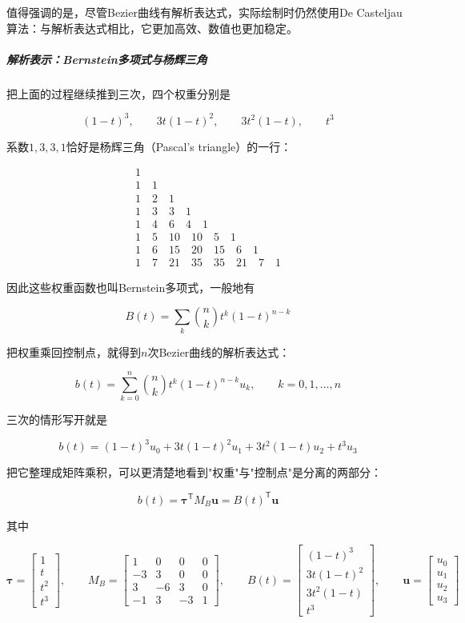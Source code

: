 值得强调的是，尽管Bezier曲线有解析表达式，实际绘制时仍然使用De Casteljau算法：与解析表达式相比，它更加高效、数值也更加稳定。

\subparagraph{解析表示：Bernstein多项式与杨辉三角}

把上面的过程继续推到三次，四个权重分别是

\[
(1-t)^3,\qquad 3t(1-t)^2,\qquad 3t^2(1-t),\qquad t^3
\]

系数$1,3,3,1$恰好是杨辉三角（Pascal's triangle）的一行：

\[
\begin{array}{c}
1\\[1pt] 1\quad 1\\[1pt] 1\quad 2\quad 1\\[1pt] 1\quad 3\quad 3\quad 1\\[1pt]
1\quad 4\quad 6\quad 4\quad 1\\[1pt] 1\quad 5\quad 10\quad 10\quad 5\quad 1\\[1pt]
1\quad 6\quad 15\quad 20\quad 15\quad 6\quad 1\\[1pt]
1\quad 7\quad 21\quad 35\quad 35\quad 21\quad 7\quad 1
\end{array}
\]

因此这些权重函数也叫Bernstein多项式，一般地有

\[
B(t) = \sum_{k}\binom{n}{k}t^k(1-t)^{n-k}
\]

把权重乘回控制点，就得到$n$次Bezier曲线的解析表达式：

\[
b(t) = \sum_{k=0}^{n}\binom{n}{k}t^k(1-t)^{n-k}u_k,\qquad k = 0,1,\dots,n
\]

三次的情形写开就是

\[
b(t) = (1-t)^3u_0 + 3t(1-t)^2u_1 + 3t^2(1-t)u_2 + t^3u_3
\]

把它整理成矩阵乘积，可以更清楚地看到"权重"与"控制点"是分离的两部分：

\[
b(t) = \boldsymbol\tau^{\mathsf T}M_B\mathbf u = B(t)^{\mathsf T}\mathbf u
\]

其中

\[
\boldsymbol\tau = \begin{bmatrix}1\\t\\t^2\\t^3\end{bmatrix},\qquad
M_B = \begin{bmatrix}
    1 & 0 & 0 & 0\\
    -3 & 3 & 0 & 0\\
    3 & -6 & 3 & 0\\
    -1 & 3 & -3 & 1
\end{bmatrix},\qquad
B(t) = \begin{bmatrix}
    (1-t)^3\\ 3t(1-t)^2\\ 3t^2(1-t)\\ t^3
\end{bmatrix},\qquad
\mathbf u = \begin{bmatrix}u_0\\u_1\\u_2\\u_3\end{bmatrix}
\]


